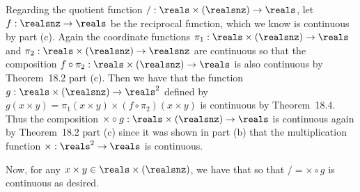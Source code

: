 {{    Regarding the quotient function $/: \reals \times (\realsnz) \to \reals$, let $f: \realsnz \to \reals$ be the reciprocal function, which we know is continuous by part (c).
    Again the coordinate functions $\pi_1: \reals \times (\realsnz) \to \reals$ and $\pi_2: \reals \times (\realsnz) \to \realsnz$ are continuous so that the composition $f \circ \pi_2: \reals \times (\realsnz) \to \reals$ is also continuous by Theorem~18.2 part (c).
    Then we have that the function $g: \reals \times (\realsnz) \to \reals^2$ defined by $g(x \times y) = \pi_1(x \times y) \times (f \circ \pi_2)(x \times y)$ is continuous by Theorem~18.4.
    Thus the composition $\times \circ g : \reals \times (\realsnz) \to \reals$ is continuous again by Theorem~18.2 part (c) since it was shown in part (b) that the multiplication function $\times: \reals^2 \to \reals$ is continuous.

    Now, for any $x \times y \in \reals \times (\realsnz)$, we have that
    so that $/ = \times \circ g$ is continuous as desired.
  }
}
